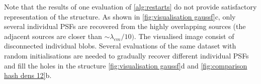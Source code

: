 Note that the results of one evaluation of \autoref{alg:restarts} do not provide satisfactory representation of the structure. As shown in \autoref{fig:visualisation gaussf}c, only several individual PSFs are recovered from the highly overlapping sources (the adjacent sources are closer than $\sim \lambda_{em}/10)$. The visualised image consist of disconnected individual blobs. Several evaluations of the same dataset with random initialisations are needed to gradually recover different individual PSFs and fill the holes in the structure \autoref{fig:visualisation gaussf}d and \autoref{fig:comparison hash dens 12}b.



\clearpage
